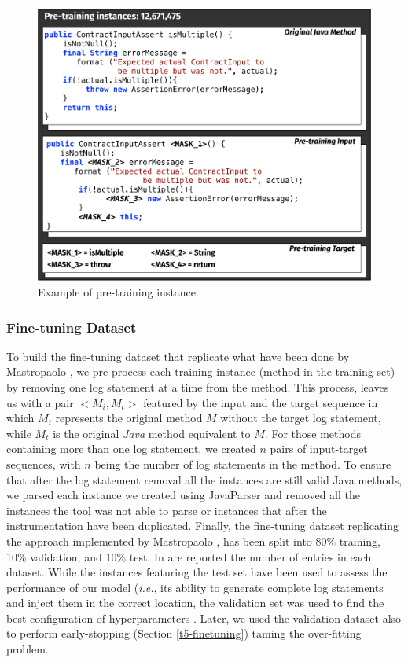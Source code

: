 \begin{figure}[h!]
	\label{pre-training}
	\includegraphics[width=\columnwidth]{img/pre-training.pdf}
	\caption{Example of pre-training instance.}
\end{figure}




\subsubsection{Fine-tuning Dataset}
To build the fine-tuning dataset that replicate what have been done by Mastropaolo \etal \cite{mastropaolo2022using}, we pre-process each training instance (\ie \java method in the training-set) by removing one log statement at a time from the \java method. This process, leaves us with a pair $<M_i, M_t>$ featured by the input and the target sequence in which $M_i$ represents the original \java method $M$ without the target log statement, while $M_t$ is the original \emph{Java} method equivalent to $M$. For those methods containing more than one log statement, we created $n$ pairs of input-target sequences, with $n$ being the number of log statements in the method. To ensure that after the log statement removal all the instances are still valid Java methods, we parsed each instance we created using JavaParser \cite{} and removed all the instances the tool was not able to parse or instances that after the instrumentation have been duplicated. Finally, the fine-tuning dataset replicating the approach implemented by Mastropaolo \etal \cite{mastropaolo2022using}, has been split into 80\% training, 10\% validation, and 10\% test. In  are reported the number of entries in each dataset. While the instances featuring the test set have been used to assess the performance of our model (\emph{i.e.}, its ability to generate complete log statements and inject them in the correct location, the validation set was used to find the best configuration of hyperparameters . Later, we used the validation dataset also to perform early-stopping (Section \ref{t5-finetuning}) taming the over-fitting problem.


